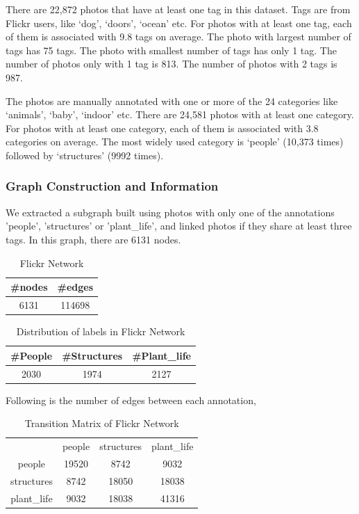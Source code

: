 There are 22,872 photos that have at least one tag in this dataset. Tags are from Flickr users, like ‘dog’, ‘doors’, ‘ocean’ etc. For photos with at least one tag, each of them is associated with 9.8 tags on average. The photo with largest number of tags has 75 tags. The photo with smallest number of tags has only 1 tag. The number of photos only with 1 tag is 813. The number of photos with 2 tags is 987.

The photos are manually annotated with one or more of the 24 categories like ‘animals’, ‘baby’, ‘indoor’ etc. There are 24,581 photos with at least one category. For photos with at least one category, each of them is associated with 3.8 categories on average.  The most widely used category is ‘people’ (10,373 times) followed by ‘structures’ (9992 times). 

\subsubsection*{Graph Construction and Information}
We extracted a subgraph built using photos with only one of the annotations 'people', 'structures' or 'plant\_life', and linked photos if they share at least three tags. In this graph, there are 6131 nodes. 

\begin{table}[!ht]
\centering
\begin{tabular}{cc}
\toprule
\textbf{\#nodes} & \textbf{\#edges}\\
\midrule
6131 & 114698\\
\bottomrule
\end{tabular}
\caption{Flickr Network}
\end{table}

\begin{table}[!ht]
\centering
\begin{tabular}{ccc}
\toprule
\textbf{\#People} & \textbf{\#Structures} & \textbf{\#Plant\_life}\\
\midrule
2030 & 1974 & 2127\\
\bottomrule
\end{tabular}
\caption{Distribution of labels in Flickr Network}
\end{table}

Following is the number of edges between each annotation,
\begin{table}[!ht]
\centering
\begin{tabular}{c|c|c|c}
\toprule
& people & structures & plant\_life\\
people & 19520 & 8742 & 9032\\
structures & 8742 & 18050 & 18038\\
plant\_life & 9032 & 18038 & 41316\\
\bottomrule
\end{tabular}
\caption{Transition Matrix of Flickr Network}
\end{table}

